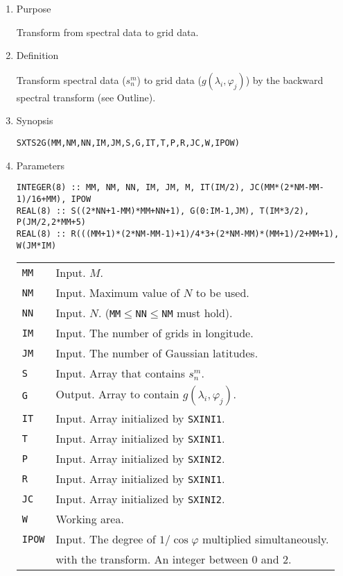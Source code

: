 \documentclass[a4paper]{scrartcl}
\begin{document}
\begin{enumerate}

\item Purpose 

Transform from spectral data to grid data.

\item Definition

Transform spectral data ($s^m_n$) 
to grid data ($g(\lambda_i,\varphi_j)$)
by the backward spectral transform (see Outline).

\item Synopsis 

\texttt{SXTS2G(MM,NM,NN,IM,JM,S,G,IT,T,P,R,JC,W,IPOW)}
  
\item Parameters

\begin{verbatim}        
INTEGER(8) :: MM, NM, NN, IM, JM, M, IT(IM/2), JC(MM*(2*NM-MM-1)/16+MM), IPOW
REAL(8) :: S((2*NN+1-MM)*MM+NN+1), G(0:IM-1,JM), T(IM*3/2), P(JM/2,2*MM+5)
REAL(8) :: R(((MM+1)*(2*NM-MM-1)+1)/4*3+(2*NM-MM)*(MM+1)/2+MM+1), W(JM*IM)
\end{verbatim}      

\begin{tabular}{ll}
\texttt{MM} & Input. $M$.\\
\texttt{NM} & Input. Maximum value of $N$ to be used.\\
\texttt{NN} & Input. $N$. 
(\texttt{MM}$\le$\texttt{NN}$\le$\texttt{NM} must hold).\\
\texttt{IM} & Input. The number of grids in longitude.\\
\texttt{JM} & Input. The number of Gaussian latitudes.\\
\texttt{S} & Input. Array that contains $s^m_n$.\\
\texttt{G} & Output. Array to contain $g(\lambda_i,\varphi_j)$.\\
\texttt{IT} & Input. Array initialized by \texttt{SXINI1}.\\
\texttt{T} & Input. Array initialized by \texttt{SXINI1}.\\
\texttt{P}  & Input. Array initialized by \texttt{SXINI2}.\\
\texttt{R}  & Input. Array initialized by \texttt{SXINI1}.\\
\texttt{JC}  & Input. Array initialized by \texttt{SXINI2}.\\
\texttt{W} & Working area.\\
\texttt{IPOW} & Input. The degree of $1/\cos\varphi$ multiplied 
simultaneously. \\
& with the transform. An integer between 0 and 2.
\end{tabular}


\end{enumerate}
\end{document}

